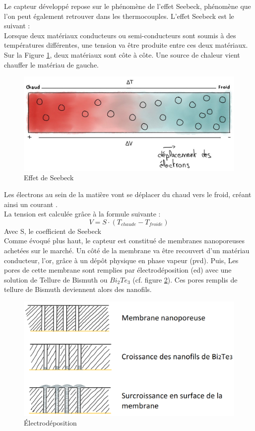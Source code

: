 Le capteur développé repose sur le phénomène de l'effet Seebeck, phénomène que l'on peut également retrouver dans les thermocouples. L'effet 
Seebeck est le suivant :\\
Lorsque deux matériaux conducteurs ou semi-conducteurs sont soumis à des températures différentes, une tension va être produite entre ces deux matériaux. \\
Sur la Figure \ref{fig:Seebeck}, deux matériaux sont côte à côte. Une source de chaleur vient chauffer le matériau de gauche. 
\begin{figure}[H]
    \centering
    \includegraphics[scale = 0.3]{images/Seebeck.jpg}
    \caption{Effet de Seebeck}
    \label{fig:Seebeck}
\end{figure}
Les électrons au sein de la matière vont se déplacer du chaud vers le froid, créant ainsi un courant \cite{instrumentys_effet_2021}.\\
La tension est calculée grâce à la formule suivante :
\[V = S \cdot (T_{chaude} - T_{froide})\]
Avec S, le coefficient de Seebeck\\

Comme évoqué plus haut, le capteur est constitué de membranes nanoporeuses achetées sur le marché. 
Un côté de la membrane va être recouvert d'un matériau conducteur, l'or, grâce à un dépôt physique en phase vapeur (\gls{pvd}). Puis, Les pores de cette membrane sont remplies par 
électrodéposition (\gls{ed}) avec une solution de Tellure de Bismuth ou $Bi_2Te_3$ (cf. figure \ref{fig:electrodeposition}). Ces pores remplis de tellure de 
Bismuth deviennent alors des nanofils. 
\begin{figure}[H]
    \centering
    \includegraphics[scale = 0.4]{images/Electrodeposition.png}
    \caption{Électrodéposition}
    \label{fig:electrodeposition}
\end{figure}

